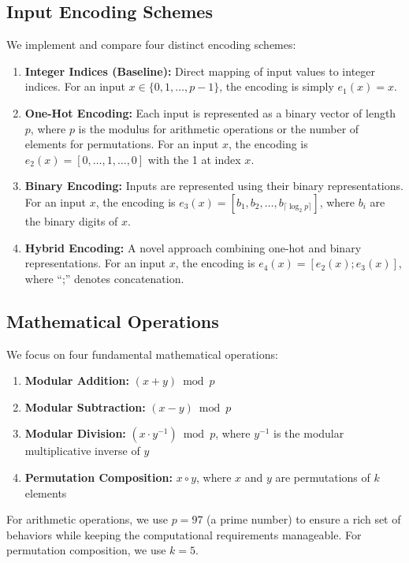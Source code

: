 \documentclass{article} %
\begin{document}
\subsection{Input Encoding Schemes}
We implement and compare four distinct encoding schemes:

\begin{enumerate}
    \item \textbf{Integer Indices (Baseline):} Direct mapping of input values to integer indices. For an input $x \in \{0, 1, \ldots, p-1\}$, the encoding is simply $e_1(x) = x$.
    
    \item \textbf{One-Hot Encoding:} Each input is represented as a binary vector of length $p$, where $p$ is the modulus for arithmetic operations or the number of elements for permutations. For an input $x$, the encoding is $e_2(x) = [0, \ldots, 1, \ldots, 0]$ with the 1 at index $x$.
    
    \item \textbf{Binary Encoding:} Inputs are represented using their binary representations. For an input $x$, the encoding is $e_3(x) = [b_1, b_2, \ldots, b_{\lceil \log_2 p \rceil}]$, where $b_i$ are the binary digits of $x$.
    
    \item \textbf{Hybrid Encoding:} A novel approach combining one-hot and binary representations. For an input $x$, the encoding is $e_4(x) = [e_2(x); e_3(x)]$, where ``;'' denotes concatenation.
\end{enumerate}

\subsection{Mathematical Operations}
We focus on four fundamental mathematical operations:

\begin{enumerate}
    \item \textbf{Modular Addition:} $(x + y) \bmod p$
    \item \textbf{Modular Subtraction:} $(x - y) \bmod p$
    \item \textbf{Modular Division:} $(x \cdot y^{-1}) \bmod p$, where $y^{-1}$ is the modular multiplicative inverse of $y$
    \item \textbf{Permutation Composition:} $x \circ y$, where $x$ and $y$ are permutations of $k$ elements
\end{enumerate}

For arithmetic operations, we use $p = 97$ (a prime number) to ensure a rich set of behaviors while keeping the computational requirements manageable. For permutation composition, we use $k = 5$.
\end{document}
